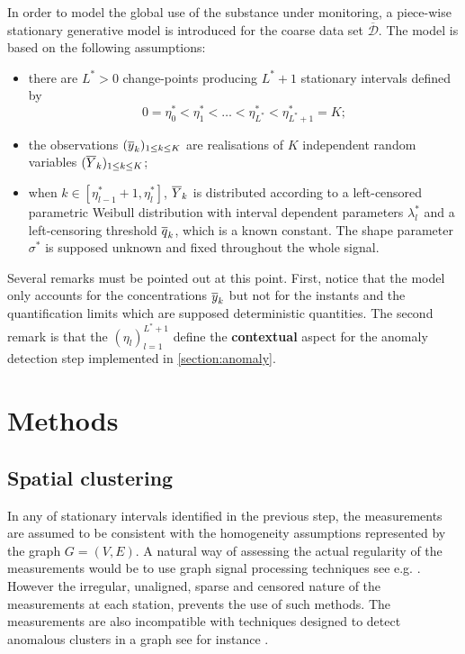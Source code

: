 In order to model the global use of the substance under monitoring, a piece-wise stationary generative model is introduced for the coarse data set $\overline{\mathcal{D}}$. The model is based on the following assumptions:
\begin{itemize}
    \item there are $L^*>0$ change-points producing $L^*+1$ stationary intervals defined by
\begin{equation*}
0=\eta_0^*<\eta_1^*<\ldots<\eta_{L^*}^*<\eta^*_{L^*+1}=K;    
\end{equation*}    
    \item the observations $(\overline{y}_k)_{1\leq k\leq K}$ are realisations of $K$ independent random variables $(\overline{Y}_k)_{1\leq k\leq K}$;
    \item when $k\in [\eta^*_{l-1}+1, \eta^*_{l}]$, $\overline{Y}_k$ is distributed according to a left-censored parametric Weibull distribution with interval dependent parameters $\lambda^*_l$ and a left-censoring threshold $\overline{q}_k$, which is a known constant. The shape parameter $\sigma^*$ is supposed unknown and fixed throughout the whole signal. 
\end{itemize}
Several remarks must be pointed out at this point. First, notice that the model only accounts for the concentrations $\overline{y}_k$ but not for the instants and the quantification limits which are supposed deterministic quantities. The second remark is that the $(\eta_l)_{l=1}^{L^*+1}$ define the \textbf{contextual} aspect for the anomaly detection step implemented in \ref{section:anomaly}.  

\section{Methods}\label{section:methods}

\subsection{Spatial clustering}\label{section:spaceclust}

In any of stationary intervals identified in the previous step, the measurements are assumed to be consistent with the homogeneity assumptions represented by the graph $G=(V, E)$. A natural way of assessing the actual regularity of the measurements would be to use graph signal processing techniques see e.g. \cite{8347162, 6494675}. However the irregular, unaligned, sparse and censored nature of the measurements at each station, prevents the use of such methods. The measurements are also incompatible with techniques designed to detect anomalous clusters in a graph see for instance \cite{10.1214/10-AOS839}.

